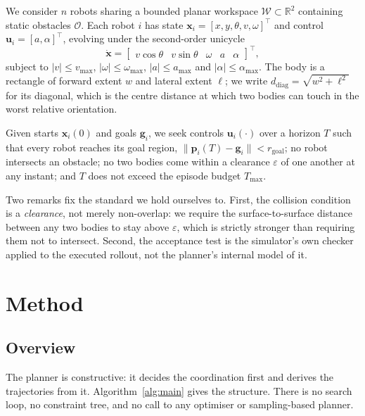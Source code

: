 \documentclass[conference]{IEEEtran}
\begin{document}
We consider $n$ robots sharing a bounded planar workspace $\mathcal{W} \subset
\mathbb{R}^2$ containing static obstacles $\mathcal{O}$. Each robot $i$ has state
$\mathbf{x}_i = [x, y, \theta, v, \omega]^\top$ and control
$\mathbf{u}_i = [a, \alpha]^\top$, evolving under the second-order unicycle
\begin{equation}
\dot{\mathbf{x}} =
\begin{bmatrix} v\cos\theta & v\sin\theta & \omega & a & \alpha \end{bmatrix}^\top ,
\label{eq:dyn}
\end{equation}
subject to $|v| \le v_{\max}$, $|\omega| \le \omega_{\max}$, $|a| \le a_{\max}$ and
$|\alpha| \le \alpha_{\max}$. The body is a rectangle of forward extent $w$ and lateral
extent $\ell$; we write $d_{\mathrm{diag}} = \sqrt{w^2 + \ell^2}$ for its diagonal, which
is the centre distance at which two bodies can touch in the worst relative orientation.

Given starts $\mathbf{x}_i(0)$ and goals $\mathbf{g}_i$, we seek controls
$\mathbf{u}_i(\cdot)$ over a horizon $T$ such that every robot reaches its goal region,
$\|\mathbf{p}_i(T) - \mathbf{g}_i\| < r_{\mathrm{goal}}$; no robot intersects an obstacle;
no two bodies come within a clearance $\varepsilon$ of one another at any instant; and
$T$ does not exceed the episode budget $T_{\max}$.

Two remarks fix the standard we hold ourselves to. First, the collision condition is a
\emph{clearance}, not merely non-overlap: we require the surface-to-surface distance
between any two bodies to stay above $\varepsilon$, which is strictly stronger than
requiring them not to intersect. Second, the acceptance test is the simulator's own
checker applied to the executed rollout, not the planner's internal model of it.

\section{Method}

\subsection{Overview}

The planner is constructive: it decides the coordination first and derives the
trajectories from it. Algorithm~\ref{alg:main} gives the structure. There is no search
loop, no constraint tree, and no call to any optimiser or sampling-based planner.
\end{document}
